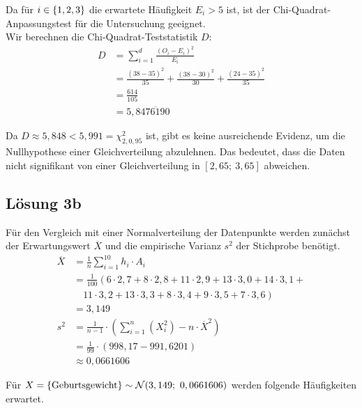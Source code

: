 \documentclass[main.tex]{subfiles}
\begin{document}
Da für $i \in \{1, 2, 3\}$ die erwartete Häufigkeit $E_i > 5$ ist, ist der Chi-Quadrat-Anpassungstest für die Untersuchung geeignet.\\

Wir berechnen die Chi-Quadrat-Teststatistik $D$:
$$\begin{aligned}
	D &= \sum_{i=1}^{d} \frac{(O_i - E_i)^2}{E_i} \\[2mm]
	&= \frac{(38 - 35)^2}{35} + \frac{(38 - 30)^2}{30} + \frac{(24 - 35)^2}{35}\\[2mm]
    &= \frac{614}{105}\\[2mm]
    &= 5,8\overline{476190}
\end{aligned}$$

Da $D \approx 5,848 < 5,991 = \chi^2_{2, 0,95}$ ist, gibt es keine ausreichende Evidenz, um die Nullhypothese einer Gleichverteilung abzulehnen. Das bedeutet, dass die Daten nicht signifikant von einer Gleichverteilung in $[2,65;\ 3,65]$ abweichen.

\subsection{Lösung 3b}
Für den Vergleich mit einer Normalverteilung der Datenpunkte werden zunächst der Erwartungswert $\overline{X}$ und die empirische Varianz $s^2$ der Stichprobe benötigt.\\

$$\begin{aligned}
    \overline{X} &= \frac{1}{n} \sum_{i=1}^{10} h_i \cdot A_i \\[2mm]
    &= \frac{1}{100} \left(
        6  \cdot 2,7 +
        8  \cdot 2,8 +
        11 \cdot 2,9 +
        13 \cdot 3,0 +
        14 \cdot 3,1 +
        \right. \\
    &\quad \left.
        11 \cdot 3,2 +
        13 \cdot 3,3 +
        8  \cdot 3,4 +
        9  \cdot 3,5 +
        7  \cdot 3,6
    \right) \\[2mm]
    &= 3,149\\[4mm]
    s^2 &= \frac{1}{n-1} \cdot \left( \sum^n_{i=1} \left(X_i^2\right) - n\cdot \overline{X}^2 \right) \\[2mm]
    &= \frac{1}{99} \cdot \left( 998,17 - 991,6201 \right)\\[2mm]
    &\approx 0,0661606
\end{aligned}$$

Für $X=\{\text{Geburtsgewicht}\}\sim \mathcal{N}(3,149;\ 0,0661606)$ werden folgende Häufigkeiten erwartet.
\end{document}
